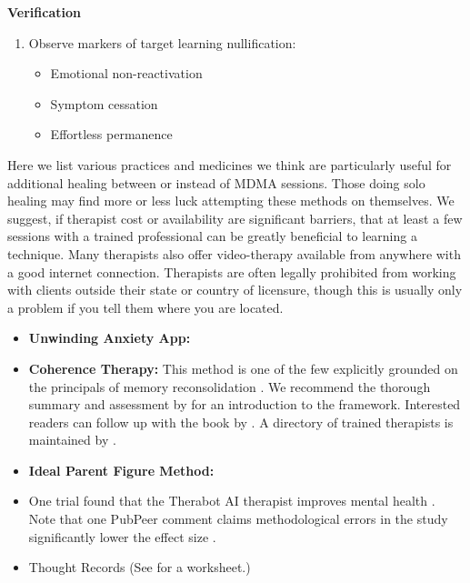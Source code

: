 \documentclass[12pt,letterpaper]{book}
\begin{document}
\noindent\textbf{Verification}
\begin{enumerate}
    \renewcommand{\labelenumi}{V.}
    \item Observe markers of target learning nullification:
    \begin{itemize}
        \item Emotional non-reactivation
        \item Symptom cessation
        \item Effortless permanence
    \end{itemize}
\end{enumerate}

Here we list various practices and medicines we think are particularly useful for additional healing between or instead of MDMA sessions. Those doing solo healing may find more or less luck attempting these methods on themselves. We suggest, if therapist cost or availability are significant barriers, that at least a few sessions with a trained professional can be greatly beneficial to learning a technique. Many therapists also offer video-therapy available from anywhere with a good internet connection. Therapists are often legally prohibited from working with clients outside their state or country of licensure, though this is usually only a problem if you tell them where you are located.
\begin{itemize}
	\item \textbf{Unwinding Anxiety App:}
 	\item \textbf{Coherence Therapy:} This method is one of the few explicitly grounded on the principals of memory reconsolidation \cite{eckerUnlocking}. We recommend the thorough summary and assessment by \textcite{lesswrongCoherenceTherapy} for an introduction to the framework. Interested readers can follow up with the book by \textcite{eckerUnlocking}. A directory of trained therapists is maintained by \textcite{coherenceDirectory}.
	\label{def:ipf}
    \item \textbf{Ideal Parent Figure Method:}
	\item One trial found that the Therabot AI therapist improves mental health \cite{llmTherapist}. Note that one PubPeer comment claims methodological errors in the study significantly lower the effect size \cite{pubpeertherabot}.
	\item Thought Records (See \textcite{harperThought} for a worksheet.)
\end{itemize}
\end{document}
